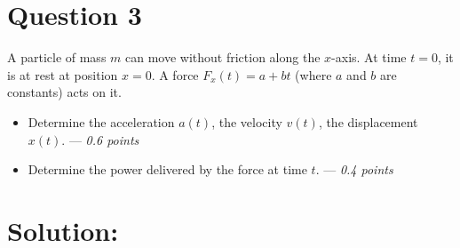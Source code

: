 \section*{Question 3}
A particle of mass $m$ can move without friction along the  $x$-axis. At time $t = 0$, it is at rest at position $x = 0$. A force $F_x(t) = a + bt$ (where $a$ and $b$ are constants) acts on it. 
\begin{itemize}
    \item[(a)] Determine the acceleration $a(t)$, the velocity $v(t)$, the displacement $x(t)$. --- \textit{0.6 points}
    \item[(b)] Determine the power delivered by the force at time $t$. --- \textit{0.4 points}
\end{itemize}

\section*{Solution:}

